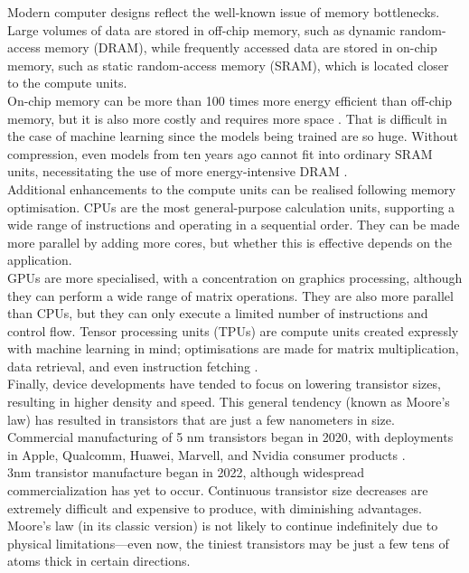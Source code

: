 \noindent Modern computer designs reflect the well-known issue of memory bottlenecks. Large volumes of data are stored in off-chip memory, such as dynamic random-access memory (DRAM), while frequently accessed data are stored in on-chip memory, such as static random-access memory (SRAM), which is located closer to the compute units. \\

\noindent On-chip memory can be more than 100 times more energy efficient than off-chip memory, but it is also more costly and requires more space \cite{han2016eie}. That is difficult in the case of machine learning since the models being trained are so huge. Without compression, even models from ten years ago cannot fit into ordinary SRAM units, necessitating the use of more energy-intensive DRAM \cite{han2015deep}.\\

\noindent Additional enhancements to the compute units can be realised following memory optimisation. CPUs are the most general-purpose calculation units, supporting a wide range of instructions and operating in a sequential order. They can be made more parallel by adding more cores, but whether this is effective depends on the application. \\

\noindent GPUs are more specialised, with a concentration on graphics processing, although they can perform a wide range of matrix operations. They are also more parallel than CPUs, but they can only execute a limited number of instructions and control flow. Tensor processing units (TPUs) are compute units created expressly with machine learning in mind; optimisations are made for matrix multiplication, data retrieval, and even instruction fetching \cite{jouppi2017datacenter}. \\

\noindent Finally, device developments have tended to focus on lowering transistor sizes, resulting in higher density and speed. This general tendency (known as Moore's law) has resulted in transistors that are just a few nanometers in size. Commercial manufacturing of 5 nm transistors began in 2020, with deployments in Apple, Qualcomm, Huawei, Marvell, and Nvidia consumer products \cite{wang2022tsmc}. \\

\noindent 3nm transistor manufacture began in 2022, although widespread commercialization has yet to occur. Continuous transistor size decreases are extremely difficult and expensive to produce, with diminishing advantages. Moore's law (in its classic version) is not likely to continue indefinitely due to physical limitations—even now, the tiniest transistors may be just a few tens of atoms thick in certain directions.


